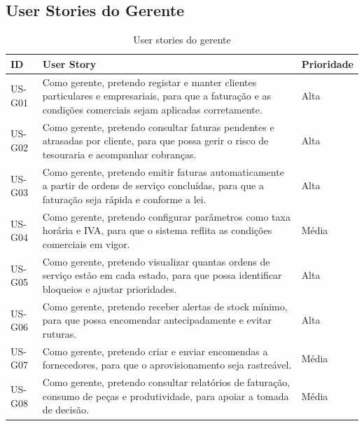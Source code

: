 \documentclass[a4paper,12pt]{scrreprt}
\begin{document}
        \subsection{User Stories do Gerente}
        \begin{table}[H]
            \centering
            \small
            \begin{tabular}{|p{1.8cm}|p{10.6cm}|p{2.6cm}|}
                \hline
                \rowcolor{gray!20!white}
                \textbf{ID} & \textbf{User Story} & \textbf{Prioridade} \\
                \hline
                US-G01 & Como gerente, pretendo registar e manter clientes particulares e empresariais, para que a faturação e as condições comerciais sejam aplicadas corretamente. & Alta \\
                \hline
                US-G02 & Como gerente, pretendo consultar faturas pendentes e atrasadas por cliente, para que possa gerir o risco de tesouraria e acompanhar cobranças. & Alta \\
                \hline
                US-G03 & Como gerente, pretendo emitir faturas automaticamente a partir de ordens de serviço concluídas, para que a faturação seja rápida e conforme a lei. & Alta \\
                \hline
                US-G04 & Como gerente, pretendo configurar parâmetros como taxa horária e IVA, para que o sistema reflita as condições comerciais em vigor. & Média \\
                \hline
                US-G05 & Como gerente, pretendo visualizar quantas ordens de serviço estão em cada estado, para que possa identificar bloqueios e ajustar prioridades. & Alta \\
                \hline
                US-G06 & Como gerente, pretendo receber alertas de stock mínimo, para que possa encomendar antecipadamente e evitar ruturas. & Alta \\
                \hline
                US-G07 & Como gerente, pretendo criar e enviar encomendas a fornecedores, para que o aprovisionamento seja rastreável. & Média \\
                \hline
                US-G08 & Como gerente, pretendo consultar relatórios de faturação, consumo de peças e produtividade, para apoiar a tomada de decisão. & Média \\
                \hline
            \end{tabular}
            \caption{User stories do gerente}
        \end{table}
\end{document}
